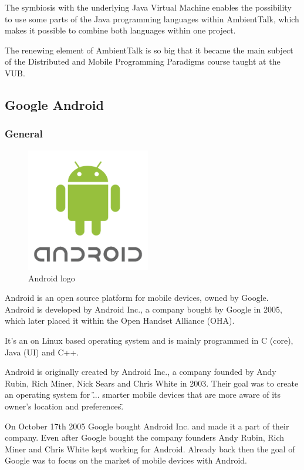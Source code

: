 \documentclass[a4paper,12pt]{report}
\begin{document}
The symbiosis with the underlying Java Virtual Machine enables the possibility to use some parts of the Java programming languages within AmbientTalk, which makes it possible to combine both languages within
one project.

The renewing element of AmbientTalk is so big that it became the main subject of the Distributed and Mobile Programming Paradigms course taught at the VUB.
\subsection{Google Android}



\subsubsection{General}
\begin{figure}
  \begin{center}
    \includegraphics[width=0.48\textwidth]{images/android.png}
  \end{center}
  \caption{Android logo}
\end{figure}
Android is an open source platform for mobile devices, owned by Google. Android is developed by Android Inc., a company bought by Google in 2005, which later placed it 
within the Open Handset Alliance (OHA). 

It's an on Linux based operating system and is mainly programmed in C (core), Java (UI) and C++.

Android is originally created by Android Inc., a company founded by Andy Rubin, Rich Miner, Nick Sears and Chris White in 2003. Their goal was to create an operating system
for \" ... smarter mobile devices that are more aware of its owner's location and preferences\". 

On October 17th 2005 Google bought Android Inc. and made it a part of their company. Even after Google bought the company founders Andy Rubin, Rich Miner and Chris White
kept working for Android. Already back then the goal of Google was to focus on the market of mobile devices with Android.
\end{document}
